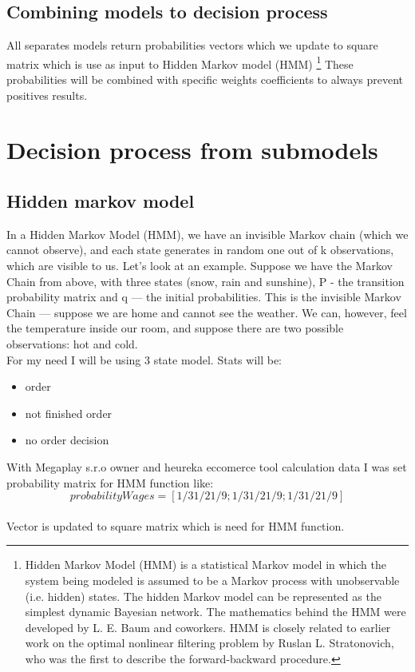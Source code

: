 \subsection{Combining models to decision process} \label{subsec:combining_models}
All separates models return probabilities vectors which we update to square matrix which is use as input to Hidden Markov model (HMM) \footnote{Hidden Markov Model (HMM) is a statistical Markov model
in which the system being modeled is assumed to be a Markov process with unobservable (i.e. hidden) states.
The hidden Markov model can be represented as the simplest dynamic Bayesian network.
The mathematics behind the HMM were developed by L. E. Baum and coworkers.
HMM is closely related to earlier work on the optimal nonlinear filtering problem by Ruslan L. Stratonovich,
who was the first to describe the forward-backward procedure.}
These probabilities will be combined with specific weights coefficients to always prevent positives results.
\section{Decision process from submodels} \label{sec:decision}
\subsection{Hidden markov model} \label{subsec:hhm}
In a Hidden Markov Model (HMM), we have an invisible Markov chain (which we cannot observe), and each state
generates in random one out of k observations, which are visible to us. Let’s look at an example.
Suppose we have the Markov Chain from above, with three states (snow, rain and sunshine),
P - the transition probability matrix and q — the initial probabilities.
This is the invisible Markov Chain — suppose we are home and cannot see the weather.
We can, however, feel the temperature inside our room, and suppose there are two possible observations: hot and cold.\\
For my need I will be using 3 state model.
Stats will be:\\
\begin{itemize}
    \item order
    \item not finished order
    \item no order decision
\end{itemize}
With Megaplay s.r.o owner and heureka eccomerce tool calculation data I was set probability matrix for HMM function like:\\
$$ probabilityWages = [ 1/3 1/2 1/9; 1/3 1/2 1/9; 1/3 1/2 1/9 ]$$ \\
Vector is updated to square matrix which is need for HMM function.\\
